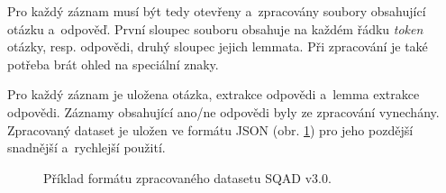 Pro každý záznam musí být tedy otevřeny a~zpracovány soubory obsahující otázku a~odpověď. První sloupec souboru obsahuje na každém řádku \emph{token} otázky, resp. odpovědi, druhý sloupec jejich lemmata. Při zpracování je také potřeba brát ohled na speciální znaky.\par
Pro každý záznam je uložena otázka, extrakce odpovědi a~lemma extrakce odpovědi. Záznamy obsahující ano/ne odpovědi byly ze zpracování vynechány. Zpracovaný dataset je uložen ve formátu JSON (obr. \ref{fig:sqad_processed}) pro jeho pozdější snadnější a~rychlejší použití.

\begin{figure}[hbt]
	\centering
	\caption{Příklad formátu zpracovaného datasetu SQAD v3.0.}
	\label{fig:sqad_processed}
\end{figure}

